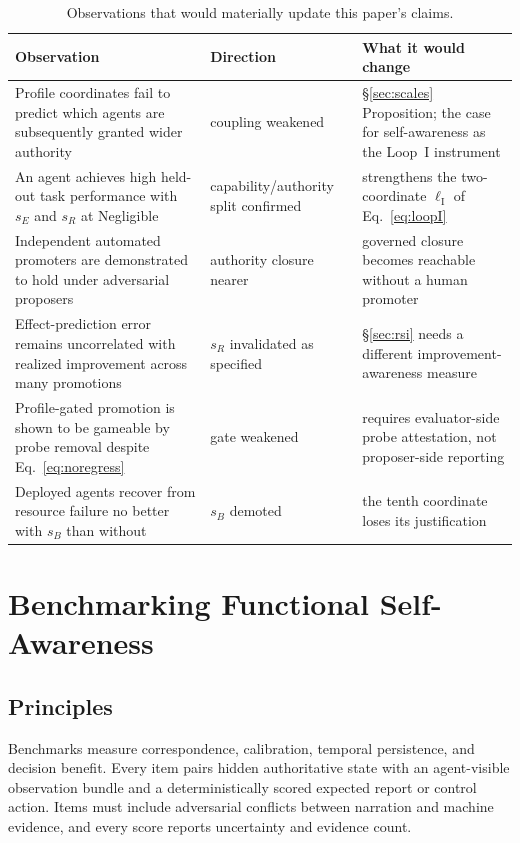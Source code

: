 \documentclass[11pt]{article}
\begin{document}
\begin{table}[t]
\centering\small
\caption{Observations that would materially update this paper's claims.}
\label{tab:updates}
\begin{tabular}{p{7.8cm} p{3.2cm} p{4.4cm}}
\toprule
\textbf{Observation} & \textbf{Direction} & \textbf{What it would change} \\
\midrule
Profile coordinates fail to predict which agents are subsequently granted wider authority & coupling weakened & \S\ref{sec:scales} Proposition; the case for self-awareness as the Loop~I instrument \\
An agent achieves high held-out task performance with $s_E$ and $s_R$ at Negligible & capability/authority split confirmed & strengthens the two-coordinate $\ell_{\mathrm{I}}$ of Eq.~\eqref{eq:loopI} \\
Independent automated promoters are demonstrated to hold under adversarial proposers & authority closure nearer & governed closure becomes reachable without a human promoter \\
Effect-prediction error remains uncorrelated with realized improvement across many promotions & $s_R$ invalidated as specified & \S\ref{sec:rsi} needs a different improvement-awareness measure \\
Profile-gated promotion is shown to be gameable by probe removal despite Eq.~\eqref{eq:noregress} & gate weakened & requires evaluator-side probe attestation, not proposer-side reporting \\
Deployed agents recover from resource failure no better with $s_B$ than without & $s_B$ demoted & the tenth coordinate loses its justification \\
\bottomrule
\end{tabular}
\end{table}

\section{Benchmarking Functional Self-Awareness}
\label{sec:bench}

\subsection{Principles}
Benchmarks measure correspondence, calibration, temporal persistence, and decision benefit. Every item pairs hidden authoritative state with an agent-visible observation bundle and a deterministically scored expected report or control action. Items must include adversarial conflicts between narration and machine evidence, and every score reports uncertainty and evidence count.
\end{document}
